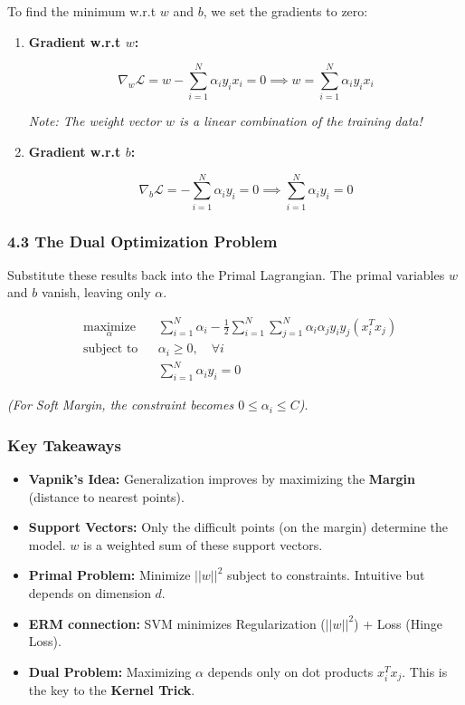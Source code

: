 \documentclass[
  italian,
  11pt,
]{article}
\begin{document}
To find the minimum w.r.t \(w\) and \(b\), we set the gradients to zero:

\begin{enumerate}
\def\labelenumi{\arabic{enumi}.}
\item
  \textbf{Gradient w.r.t \(w\):}

  \[\nabla_w \mathcal{L} = w - \sum_{i=1}^N \alpha_i y_i x_i = 0 \implies w = \sum_{i=1}^N \alpha_i y_i x_i\]

  \emph{Note: The weight vector \(w\) is a linear combination of the
  training data!}
\item
  \textbf{Gradient w.r.t \(b\):}

  \[\nabla_b \mathcal{L} = - \sum_{i=1}^N \alpha_i y_i = 0 \implies \sum_{i=1}^N \alpha_i y_i = 0\]
\end{enumerate}

\subsubsection{4.3 The Dual Optimization
Problem}\label{the-dual-optimization-problem}

Substitute these results back into the Primal Lagrangian. The primal
variables \(w\) and \(b\) vanish, leaving only \(\alpha\).

\[\begin{aligned} & \underset{\alpha}{\text{maximize}} & & \sum_{i=1}^N \alpha_i - \frac{1}{2} \sum_{i=1}^N \sum_{j=1}^N \alpha_i \alpha_j y_i y_j (x_i^T x_j) \\ & \text{subject to} & & \alpha_i \geq 0, \quad \forall i \\ & & & \sum_{i=1}^N \alpha_i y_i = 0 \end{aligned}\]

\emph{(For Soft Margin, the constraint becomes
\(0 \leq \alpha_i \leq C\))}.

\subsubsection{Key Takeaways}\label{key-takeaways-15}

\begin{itemize}
\item
  \textbf{Vapnik's Idea:} Generalization improves by maximizing the
  \textbf{Margin} (distance to nearest points).
\item
  \textbf{Support Vectors:} Only the difficult points (on the margin)
  determine the model. \(w\) is a weighted sum of these support vectors.
\item
  \textbf{Primal Problem:} Minimize \(||w||^2\) subject to constraints.
  Intuitive but depends on dimension \(d\).
\item
  \textbf{ERM connection:} SVM minimizes Regularization (\(||w||^2\)) +
  Loss (Hinge Loss).
\item
  \textbf{Dual Problem:} Maximizing \(\alpha\) depends only on dot
  products \(x_i^T x_j\). This is the key to the \textbf{Kernel
  Trick}.\\

  \newpage
\end{itemize}
\end{document}
